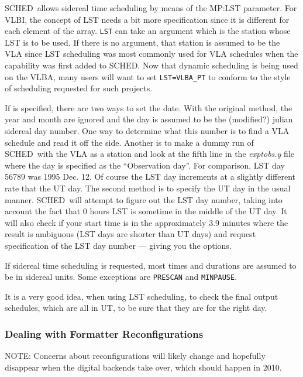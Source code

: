 \documentclass{report}
\newcommand{\sched}{{\sc SCHED}}
\newcommand{\schedb}{{\sc SCHED~}}
\begin{document}
\schedb allows sidereal time scheduling by means of the  {MP:LST} parameter.  For VLBI, the concept of LST needs a bit more
specification since it is different for each element of the array.
{\tt LST} can take an argument which is the station whose LST is to be
used.  If there is no argument, that station is assumed to be the VLA
since LST scheduling was most commonly used for VLA schedules when
the capability was first added to \sched.  Now that dynamic scheduling
is being used on the VLBA, many users will want to set
{\tt LST=VLBA\_PT} to conform to the style of scheduling requested
for such projects.

If  is specified, there are two ways to set
the date.  With the original method, the year and month are ignored
and the day is assumed to be the (modified?) julian sidereal day
number.  One way to determine what this number is to find a VLA
schedule and read it off the side.  Another is to make a dummy run of
\schedb with the VLA as a station and look at the fifth line in the
{\sl exptobs.y} file where the day is specified as the ``Observation
day''.  For comparison, LST day 56789 was 1995 Dec. 12.  Of course the
LST day increments at a slightly different rate that the UT day.
The second method is to specify the UT day in the usual manner.
\schedb will attempt to figure out the LST day number, taking into
account the fact that 0 hours LST is sometime in the middle of
the UT day.  It will also check if your start time is in the
approximately 3.9 minutes where the result is ambiguous (LST days
are shorter than UT days) and request specification of the LST
day number --- giving you the options.

If sidereal time scheduling is requested, most times and durations are
assumed to be in sidereal units.  Some exceptions are {\tt PRESCAN} and
{\tt MINPAUSE}.

It is a very good idea, when using LST scheduling, to check the
final output schedules, which are all in UT, to be sure that they
are for the right day.

\subsubsection{\label{SSSEC:Reconfigurations}Dealing with Formatter
Reconfigurations}

NOTE: Concerns about reconfigurations will likely change and hopefully
disappear when the digital backends take over, which should happen in
2010.
\end{document}
